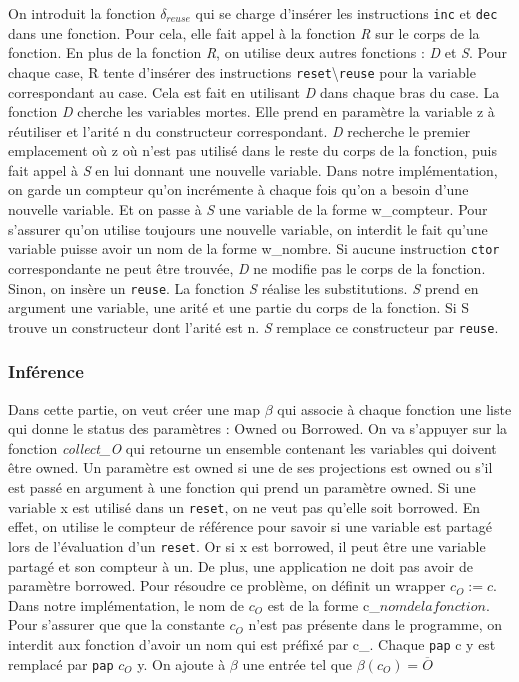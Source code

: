 \documentclass{rapportECL}
\begin{document}
On introduit la fonction $\delta_{reuse}$ qui se charge d'insérer les instructions \verb|inc| et \verb|dec| dans une fonction. Pour cela, elle fait appel à la fonction \textit{R} sur le corps de la fonction.
En plus de la fonction \textit{R}, on utilise deux autres fonctions : \textit{D} et \textit{S}.
Pour chaque case, R tente d'insérer des instructions \verb|reset|\textbackslash \verb|reuse| pour la variable correspondant au case. Cela est fait en utilisant \textit{D} dans chaque bras du case.
La fonction \textit{D} cherche les variables mortes. Elle prend en paramètre la variable z à réutiliser et l'arité n du constructeur correspondant. 
\textit{D} recherche le premier emplacement où z où n'est pas utilisé dans le reste du corps de la fonction, puis fait appel à \textit{S} en lui donnant une nouvelle variable. 
Dans notre implémentation, on garde un compteur qu'on incrémente à chaque fois qu'on a besoin d'une nouvelle variable. Et on passe à \textit{S} une variable de la forme w\_compteur. Pour s'assurer qu'on utilise toujours une nouvelle variable, on interdit le fait qu'une variable puisse avoir un nom de la forme w\_nombre. Si aucune instruction \verb|ctor| correspondante ne peut être trouvée, \textit{D} ne modifie pas le corps de la fonction. Sinon, on insère un \verb|reuse|.
La fonction \textit{S} réalise les substitutions. \textit{S} prend en argument une variable, une arité et une partie du corps de la fonction. Si S trouve un constructeur dont l'arité est n. \textit{S} remplace ce constructeur par \verb|reuse|.


\subsubsection{Inférence}
Dans cette partie, on veut créer une map $\beta$ qui associe à chaque fonction une liste qui donne le status des paramètres : Owned ou Borrowed.
On va s'appuyer sur la fonction \textit{collect\_O} qui retourne un ensemble contenant les variables qui doivent être owned.
Un paramètre est owned si une de ses projections est owned ou s'il est passé en argument à une fonction qui prend un paramètre owned.
Si une variable x est utilisé dans un \verb|reset|, on ne veut pas qu'elle soit borrowed. 
En effet, on utilise le compteur de référence pour savoir si une variable est partagé lors de l'évaluation d'un \verb|reset|. 
Or si x est borrowed, il peut être une variable partagé et son compteur à un.
De plus, une application ne doit pas avoir de paramètre borrowed. Pour résoudre ce problème, on définit un wrapper $c_O := c$. 
Dans notre implémentation, le nom de $c_O$ est de la forme c\_$nom de la fonction$. 
Pour s'assurer que que la constante $c_O$ n'est pas présente dans le programme, on interdit aux fonction d'avoir un nom qui est préfixé par c\_.
Chaque \verb|pap| c y est remplacé par \verb|pap| $c_O$ y. On ajoute à $\beta$ une entrée tel que $\beta(c_O) = \overline{O}$
\end{document}
